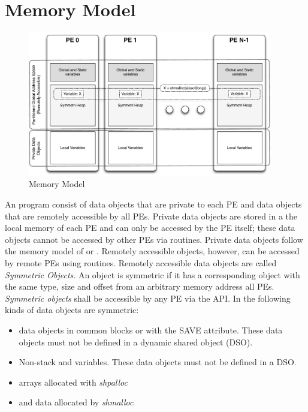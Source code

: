 \section{Memory Model}
\begin{figure}[h]
\includegraphics[width=0.95\textwidth]{diagrams/updated/mem_model}      
\caption{\OSH{} Memory Model}                                   
\label{fig:mem_model}                                               
\end{figure}      
An \openshmem program consist of data objects that are private to each \ac{PE} and data 
objects that are remotely accessible by all \ac{PE}s. Private data objects are stored in a the local
memory of each \ac{PE} and can only be accessed by the \ac{PE} itself; these data objects
cannot be accessed by other \ac{PE}s via \openshmem routines. Private data objects
follow the memory model of \Clang{} or \Fortran{}. Remotely accessible
objects, however, can be accessed by remote \ac{PE}s using \openshmem routines.
Remotely accessible data objects are called \emph{Symmetric Objects}.
An object is symmetric if it has a corresponding object with the same
type, size and offset from an arbitrary memory address all \ac{PE}s. \emph{Symmetric objects } shall be accessible by any \ac{PE} via the \openshmem \ac{API}.
In \openshmem{} the following kinds of data objects are symmetric:
\begin{itemize}
  \item \Fortran{} data objects in common blocks or with the  SAVE  attribute. These data objects	must not be defined in a dynamic shared object (DSO).
  \item Non-stack \Clang{} and \Cpp{} variables.   These  data	objects must  not  be defined in a DSO.
  \item \Fortran{} arrays allocated with \textit{shpalloc} 
  \item \Clang{} and \Cpp{} data allocated by \textit{shmalloc}
\end{itemize}       

